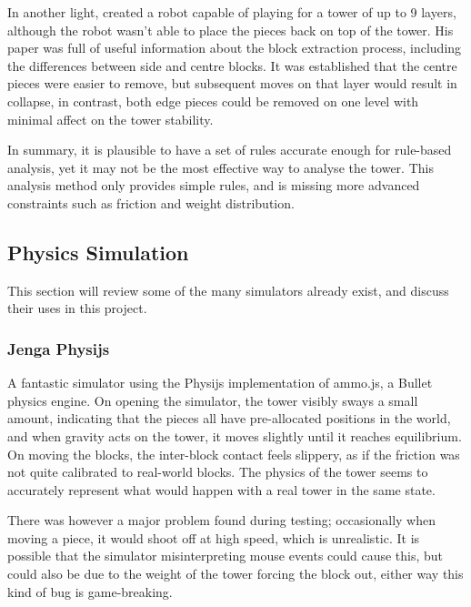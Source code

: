 In another light, \citet{jengarobot} created a robot capable of playing \jenga{} for a tower of up to 9 layers, although the robot wasn't able to place the pieces back on top of the tower. His paper was full of useful information about the block extraction process, including the differences between side and centre blocks. It was established that the centre pieces were easier to remove, but subsequent moves on that layer would result in collapse, in contrast, both edge pieces could be removed on one level with minimal affect on the tower stability.

In summary, it is plausible to have a set of rules accurate enough for rule-based analysis, yet it may not be the most effective way to analyse the tower. This analysis method only provides simple rules, and is missing more advanced constraints such as friction and weight distribution.


\subsection{Physics Simulation}\label{subsec:physicssimulation}

This section will review some of the many \jenga{} simulators already exist, and discuss their uses in this project.

\subsubsection{\protect{} Jenga Physijs}

A fantastic simulator using the Physijs implementation of ammo.js, a Bullet physics engine. On opening the simulator, the tower visibly sways a small amount, indicating that the pieces all have pre-allocated positions in the world, and when gravity acts on the tower, it moves slightly until it reaches equilibrium. On moving the blocks, the inter-block contact feels slippery, as if the friction was not quite calibrated to real-world \jenga{} blocks. The physics of the tower seems to accurately represent what would happen with a real tower in the same state.

There was however a major problem found during testing; occasionally when moving a piece, it would shoot off at high speed, which is unrealistic. It is possible that the simulator misinterpreting mouse events could cause this, but could also be due to the weight of the tower forcing the block out, either way this kind of bug is game-breaking.

